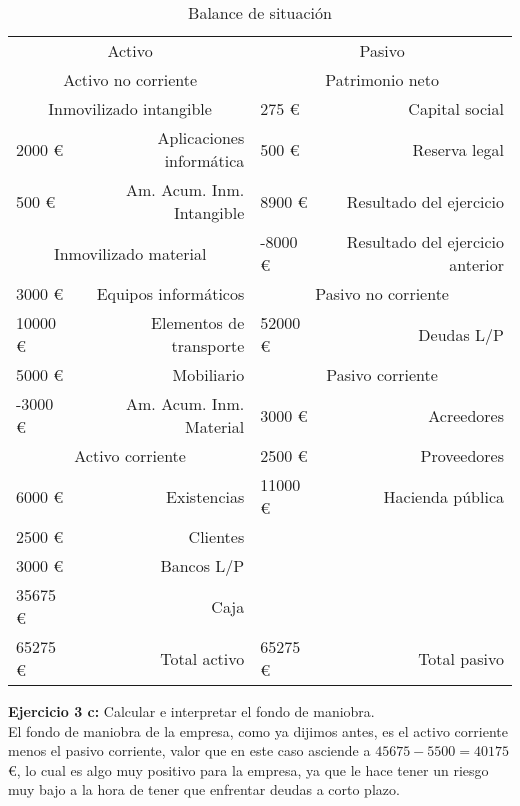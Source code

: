 \documentclass[11pt]{article}
\theoremstyle{plain}
\theoremstyle{definition}
\begin{document}
\begin{table}[H]
  \centering
  \begin{tabular}{lrlr}
    \toprule
    \multicolumn{2}{c}{Activo} & \multicolumn{2}{c}{Pasivo} \\
    \cmidrule(r){1-2} \cmidrule(l){3-4}
    \multicolumn{2}{c}{Activo no corriente} & \multicolumn{2}{c}{Patrimonio neto} \\
    \cmidrule(r){1-2} \cmidrule(l){3-4}
    \multicolumn{2}{c}{Inmovilizado intangible} & 275 € & Capital social\\
    \cmidrule(r){1-2}
    2000 € & Aplicaciones informática & 500 € & Reserva legal \\
    500 € & Am. Acum. Inm. Intangible & 8900 € & Resultado del ejercicio \\
    \cmidrule(r){1-2}
    \multicolumn{2}{c}{Inmovilizado material} & -8000 € & Resultado del ejercicio anterior \\
    \cmidrule(r){1-2} \cmidrule(l){3-4}
    3000 € & Equipos informáticos & \multicolumn{2}{c}{Pasivo no corriente} \\
    \cmidrule(l){3-4}
    10000 € & Elementos de transporte & 52000 € & Deudas L/P \\
    \cmidrule(l){3-4}
    5000 € & Mobiliario & \multicolumn{2}{c}{Pasivo corriente} \\
    \cmidrule(l){3-4}
    -3000 € & Am. Acum. Inm. Material & 3000 € & Acreedores \\
    \cmidrule(r){1-2}
    \multicolumn{2}{c}{Activo corriente} & 2500 € & Proveedores \\
    \cmidrule(r){1-2}
    6000 € & Existencias & 11000 € & Hacienda pública \\
    2500 € & Clientes & & \\
    3000 € & Bancos L/P & & \\
    35675 € & Caja & & \\
    \midrule
    65275 € & Total activo & 65275 € & Total pasivo \\
    \bottomrule
  \end{tabular}
  \caption{Balance de situación}
\end{table}

\textbf{Ejercicio 3 c:} Calcular e interpretar el fondo de maniobra.\\

El fondo de maniobra de la empresa, como ya dijimos antes, es el
activo corriente menos el pasivo corriente, valor que en este caso
asciende a $45675 - 5500 = 40175$ €, lo cual es algo muy positivo para
la empresa, ya que le hace tener un riesgo muy bajo a la hora de tener
que enfrentar deudas a corto plazo.
\end{document}
